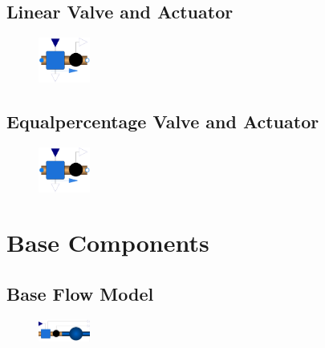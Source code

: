 \documentclass[we,final,11pt,oneside,openany]{uantwerpenbamathesis}
\begin{document}
\subsection{Linear Valve and Actuator}
\label{subsec:linear-valve-and-actuator}

\begin{figure}
    \centering
    \includegraphics[width=0.15\textwidth]{Images/components/dynamx}
\end{figure}

\lipsum[67]

\subsection{Equalpercentage Valve and Actuator}
\label{subsec:equalpercentage-valve-and-actuator}

\begin{figure}
    \centering
    \includegraphics[width=0.15\textwidth]{Images/components/dynamx}
\end{figure}

\lipsum[67]

\section{Base Components}
\label{sec:base-components}

\subsection{Base Flow Model}
\label{subsec:base-flowmodel}

\begin{figure}
    \centering
    \includegraphics[width=0.15\textwidth]{Images/components/flow-model-base}
\end{figure}
\end{document}
